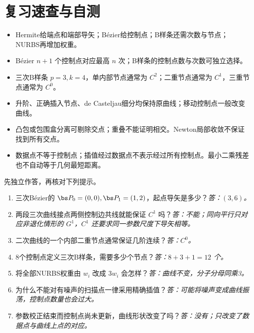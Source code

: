 \Needspace{13cm}
\section{复习速查与自测}
\begin{itemize}
 \item Hermite给端点和端部导矢；Bézier给控制点；B样条还需次数与节点；NURBS再增加权重。
 \item Bézier $n+1$ 个控制点对应最高 $n$ 次；B样条的控制点数与次数可独立选择。
 \item 三次B样条 $p=3,k=4$，单内部节点通常为 $C^2$；二重节点通常为 $C^1$，三重节点通常为 $C^0$。
 \item 升阶、正确插入节点、de Casteljau细分均保持原曲线；移动控制点一般改变曲线。
 \item 凸包或包围盒分离可剔除交点；重叠不能证明相交。Newton局部收敛不保证找到所有交点。
 \item 数据点不等于控制点；插值经过数据点不表示经过所有控制点。最小二乘残差也不自动等于几何最短距离。
\end{itemize}

先独立作答，再核对下列提示。
\begin{enumerate}
 \item 三次Bézier的 $\bs P_0=(0,0),\bs P_1=(1,2)$，起点导矢是多少？\textit{答：$(3,6)$。}
 \item 两段三次曲线接点两侧控制边共线就能保证 $C^1$ 吗？\textit{答：不能；同向平行只对应非退化情形的 $G^1$，$C^1$ 还要求同一参数尺度下导矢相等。}
 \item 二次曲线的一个内部二重节点通常保证几阶连续？\textit{答：$C^0$。}
 \item 8个控制点定义三次B样条，需要多少个节点？\textit{答：$8+3+1=12$ 个。}
 \item 将全部NURBS权重由 $w_i$ 改成 $3w_i$ 会怎样？\textit{答：曲线不变，分子分母同乘3。}
 \item 为什么不能对有噪声的扫描点一律采用精确插值？\textit{答：可能将噪声变成曲线振荡，控制点数量也会过大。}
 \item 参数校正结束而控制点尚未更新，曲线形状改变了吗？\textit{答：没有；只改变了数据点与曲线上点的对应。}
\end{enumerate}
